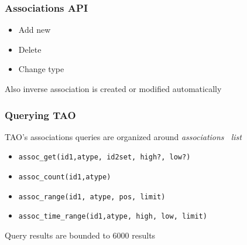 \begin{frame}
\frametitle{Associations API}
\begin{itemize}
\item Add new
\item Delete
\item Change type
\end{itemize}
Also inverse association is created or modified automatically
\end{frame}

\begin{frame}[fragile]
\frametitle{Querying TAO}
TAO's associations queries are organized around \emph{associations~ list}

\begin{itemize}
\item \verb!assoc_get(id1,atype, id2set, high?, low?)!
\item \verb!assoc_count(id1,atype)!
\item \verb!assoc_range(id1, atype, pos, limit)!
\item \verb!assoc_time_range(id1,atype, high, low, limit)!
\end{itemize}

Query results are bounded to 6000 results
\end{frame}



